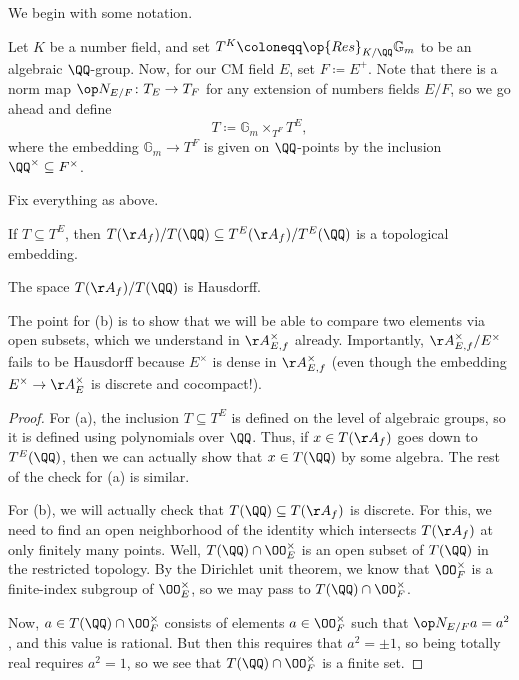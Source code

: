 \documentclass[../notes.tex]{subfiles}
\begin{document}
We begin with some notation.
\begin{notation}
	Let $K$ be a number field, and set $T^K\coloneqq\op{Res}_{K/\QQ}\mathbb G_m$ to be an algebraic $\QQ$-group. Now, for our CM field $E$, set $F\coloneqq E^+$. Note that there is a norm map $\op N_{E/F}\colon T_E\to T_F$ for any extension of numbers fields $E/F$, so we go ahead and define
	\[T\coloneqq\mathbb G_m\times_{T^F}T^E,\]
	where the embedding $\mathbb G_m\to T^F$ is given on $\QQ$-points by the inclusion $\QQ^\times\subseteq F^\times$.
\end{notation}
\begin{lemma}
	Fix everything as above.
	\begin{listalph}
		\item If $T\subseteq T^E$, then $T(\AA_{f})/T(\QQ)\subseteq T^E(\AA_f)/T^E(\QQ)$ is a topological embedding. 
		\item The space $T(\AA_f)/T(\QQ)$ is Hausdorff.
	\end{listalph}
\end{lemma}
The point for (b) is to show that we will be able to compare two elements via open subsets, which we understand in $\AA_{E,f}^\times$ already. Importantly, $\AA_{E,f}^\times/E^\times$ fails to be Hausdorff because $E^\times$ is dense in $\AA_{E,f}^\times$ (even though the embedding $E^\times\to\AA_{E}^\times$ is discrete and cocompact!).
\begin{proof}
	For (a), the inclusion $T\subseteq T^E$ is defined on the level of algebraic groups, so it is defined using polynomials over $\QQ$. Thus, if $x\in T(\AA_f)$ goes down to $T^E(\QQ)$, then we can actually show that $x\in T(\QQ)$ by some algebra. The rest of the check for (a) is similar.

	For (b), we will actually check that $T(\QQ)\subseteq T(\AA_f)$ is discrete. For this, we need to find an open neighborhood of the identity which intersects $T(\AA_f)$ at only finitely many points. Well, $T(\QQ)\cap\OO_E^\times$ is an open subset of $T(\QQ)$ in the restricted topology. By the Dirichlet unit theorem, we know that $\OO_F^\times$ is a finite-index subgroup of $\OO_E^\times$, so we may pass to $T(\QQ)\cap\OO_F^\times$.

	Now, $a\in T(\QQ)\cap\OO_F^\times$ consists of elements $a\in\OO_F^\times$ such that $\op N_{E/F}a=a^2$, and this value is rational. But then this requires that $a^2=\pm1$, so being totally real requires $a^2=1$, so we see that $T(\QQ)\cap\OO_F^\times$ is a finite set.
\end{proof}
\end{document}

